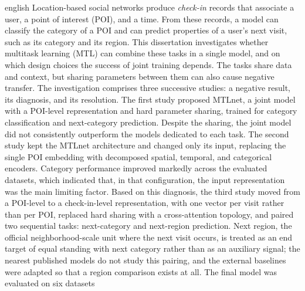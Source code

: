 \begin{resumo}[Abstract]
\begin{otherlanguage*}{english}
            \noindent Location-based social networks produce \emph{check-in} records
            that associate a user, a point of interest (POI), and a time. From these
            records, a model can classify the category of a POI and can predict
            properties of a user's next visit, such as its category and its region.
            This dissertation investigates whether multitask learning (MTL) can
            combine these tasks in a single model, and on which design choices the
            success of joint training depends. The tasks share data and context, but
            sharing parameters between them can also cause negative transfer. The
            investigation comprises three successive studies: a negative result, its
            diagnosis, and its resolution. The first study proposed MTLnet, a joint
            model with a POI-level representation and hard parameter sharing, trained
            for category classification and next-category prediction. Despite the
            sharing, the joint model did not consistently outperform the models
            dedicated to each task. The second study kept the MTLnet architecture and
            changed only its input, replacing the single POI embedding with decomposed
            spatial, temporal, and categorical encoders. Category performance improved
            markedly across the evaluated datasets, which indicated that, in that
            configuration, the input representation was the main limiting factor.
            Based on this diagnosis, the third study moved from a POI-level to a
            check-in-level representation, with one vector per visit rather than per
            POI, replaced hard sharing with a cross-attention topology, and paired two
            sequential tasks: next-category and next-region prediction. Next region,
            the official neighborhood-scale unit where the next visit occurs, is
            treated as an end target of equal standing with next category rather than
            as an auxiliary signal; the nearest published models do not study this
            pairing, and the external baselines were adapted so that a region
            comparison exists at all. The final model was evaluated on six datasets

\end{otherlanguage*}
\end{resumo}
